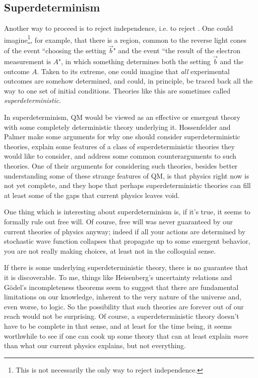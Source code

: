 \subsection{Superdeterminism}

Another way to proceed is to reject independence, i.e. to reject
. One could imagine\footnote{This is not necessarily
the only way to reject independence.}, for example, that there
is a region, common to the reverse light cones of the event ``choosing the
setting $\vec{b}$" and the event ``the result of the electron measurement
is $A$", in which something determines both the setting $\vec{b}$ and
the outcome $A$. Taken to its extreme, one could imagine that {\it all}
experimental outcomes are somehow determined, and could, in principle, be
traced back all the way to one set of initial conditions. Theories like
this are sometimes called {\it superdeterministic}.

In superdeterminism, QM would be viewed as an effective or emergent theory
with some completely deterministic theory underlying it. Hossenfelder
and Palmer \cite{hossenfelder_rethinking_2020} make some arguments for
why one should consider superdeterministic theories, explain some features
of a class of superdeterministic theories they would like to consider, and
address some common counterarguments to such theories. One of their arguments
for considering such theories, besides better understanding some of these
strange features of QM, is that physics right now is not yet complete,
and they hope that perhaps superdeterministic theories can fill at least
some of the gaps that current physics leaves void.

One thing which is interesting about superdeterminism is, if it's true,
it seems to formally rule out free will. Of course, free will was never
guaranteed by our current theories of physics anyway; indeed if all your
actions are determined by stochastic wave function collapses that 
propagate up to some emergent behavior, you are not really making
choices, at least not in the colloquial sense.

If there is some underlying superdeterministic theory, there is no guarantee
that it is discoverable. To me, things like Heisenberg's uncertainty relations
and G\"odel's incompleteness theorems seem to suggest that there are
fundamental limitations on our knowledge, inherent to the very nature of
the universe and, even worse, to logic. So the possibility that such theories
are forever out of our reach would not be surprising. Of course, a
superdeterministic theory doesn't have to be complete in that sense, and 
at least for the time being, it seems worthwhile to see if one can cook up
some theory that can at least explain {\it more} than what our current
physics explains, but not everything.





